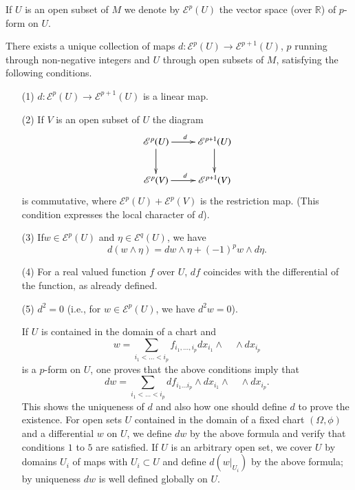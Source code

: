 If $U$ is an open subset of $M$ we denote by $\mathscr{E}^{p}(U)$ the vector space (over $\mathbb{R}$) of $p$-form on $U$.

\begin{proposition}\label{sec4-prop4.1}
There exists a unique collection of maps $d:\mathscr{E}^{p}(U)\to \mathscr{E}^{p+1}(U)$, $p$ running through non-negative integers and $U$ through open subsets of $M$, satisfying the following conditions.
\begin{itemize}
\item[\rm(1)] $d:\mathscr{E}^{p}(U)\to \mathscr{E}^{p+1}(U)$ is a linear map.

\item[\rm(2)] If $V$ is an open subset of $U$ the diagram
\[
\xymatrix{
\mathscr{E}^{p}(U)\ar[d]\ar[r]^{d} & \mathscr{E}^{p+1}(U)\ar[d]\\
\mathscr{E}^{p}(V)\ar[r]^{d} & \mathscr{E}^{p+1}(V)
}
\]
is commutative, where $\mathscr{E}^{p}(U)+\mathscr{E}^{p}(V)$ is the restriction map. (This condition expresses the local character of $d$).

\item[\rm(3)] If\pageoriginale $w\in \mathscr{E}^{p}(U)$ and $\eta\in \mathscr{E}^{q}(U)$, we have
$$
d(w\wedge \eta)=dw\wedge \eta+(-1)^{p}w\wedge d\eta.
$$

\item[\rm(4)] For a real valued function $f$ over $U$, $df$ coincides with the differential of the function, as already defined.

\item[\rm(5)] $d^{2}=0$ (i.e., for $w\in \mathscr{E}^{p}(U)$, we have $d^{2}w=0$).

If $U$ is contained in the domain of a chart and
$$
w=\sum\limits_{i_{1}<\ldots < i_{p}}f_{i_{1},\ldots,i_{p}}dx_{i_{1}}\wedge\quad\wedge dx_{i_{p}}
$$
is a $p$-form on $U$, one proves that the above conditions imply that
$$
dw=\sum\limits_{i_{1}<\ldots<i_{p}}df_{i_{1}\ldots i_{p}}\wedge dx_{i_{1}}\wedge\quad\wedge dx_{i_{p}}.
$$
This shows the uniqueness of $d$ and also how one should define $d$ to prove the existence. For open sets $U$ contained in the domain of a fixed chart $(\Omega,\phi)$ and a differential $w$ on $U$, we define $dw$ by the above formula and verify that conditions $1$ to $5$ are satisfied. If $U$ is an arbitrary open set, we cover $U$ by domains $U_{i}$ of maps with $U_{i}\subset U$ and define $d(w|_{U_{i}})$ by the above formula; by uniqueness $dw$ is well defined globally on $U$.
\end{itemize}
\end{proposition}

